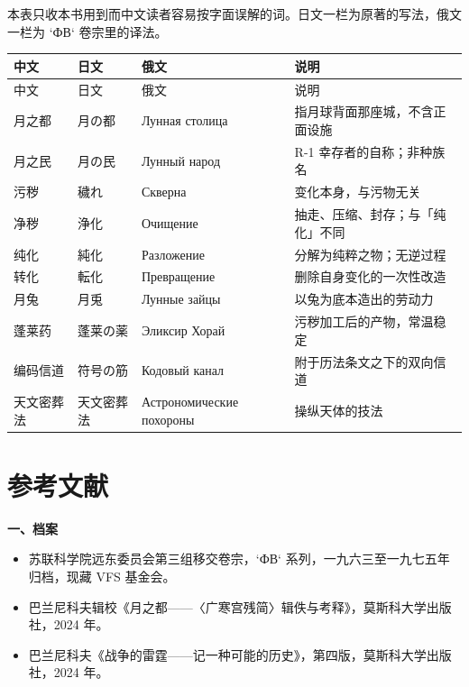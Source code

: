 \noindent
本表只收本书用到而中文读者容易按字面误解的词。日文一栏为原著的写法，俄文一栏为 `ФВ` 卷宗里的译法。

\begingroup
\small
\renewcommand{\arraystretch}{1.18}
\begin{longtable}{@{}p{28mm}p{28mm}p{34mm}p{44mm}@{}}
\toprule
中文 & 日文 & 俄文 & 说明\\
\midrule
\endfirsthead
\toprule
中文 & 日文 & 俄文 & 说明\\
\midrule
\endhead
\bottomrule
\endfoot
月之都 & 月の都 & Лунная столица & 指月球背面那座城，不含正面设施\\
月之民 & 月の民 & Лунный народ & R-1 幸存者的自称；非种族名\\
污秽 & 穢れ & Скверна & 变化本身，与污物无关\\
净秽 & 浄化 & Очищение & 抽走、压缩、封存；与「纯化」不同\\
纯化 & 純化 & Разложение & 分解为纯粹之物；无逆过程\\
转化 & 転化 & Превращение & 删除自身变化的一次性改造\\
月兔 & 月兎 & Лунные зайцы & 以兔为底本造出的劳动力\\
蓬莱药 & 蓬莱の薬 & Эликсир Хорай & 污秽加工后的产物，常温稳定\\
编码信道 & 符号の筋 & Кодовый канал & 附于历法条文之下的双向信道\\
天文密葬法 & 天文密葬法 & Астрономические похороны & 操纵天体的技法\\
\end{longtable}
\endgroup

\clearpage

\chapter*{参考文献}
{}

\begingroup
\small
\linespread{1.24}\selectfont
\noindent\textbf{一、档案}
\begin{itemize}[leftmargin=2em,itemsep=1pt,topsep=2pt]
\item 苏联科学院远东委员会第三组移交卷宗，`ФВ` 系列，一九六三至一九七五年归档，现藏 VFS 基金会。
\item 巴兰尼科夫辑校《月之都——〈广寒宫残简〉辑佚与考释》，莫斯科大学出版社，2024 年。
\item 巴兰尼科夫《战争的雷霆——记一种可能的历史》，第四版，莫斯科大学出版社，2024 年。
\end{itemize}

